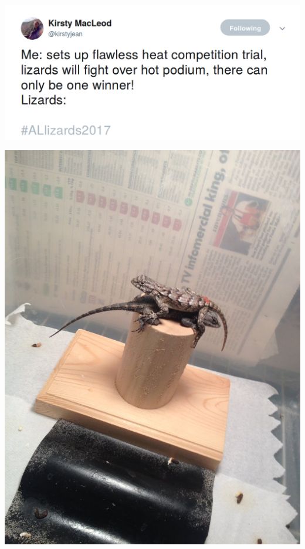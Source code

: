 \documentclass{beamer}
\begin{document}
\begin{frame}
    \begin{center}
        \includegraphics[width=.7\textwidth]{static/lizard-tweet.png}
    \end{center}
    \begin{center}
        \pause
        \includegraphics[width=.35\textwidth]{static/lizard-cooperation.jpg}
    \end{center}
\end{frame}


\begin{frame}
    \begin{center}
    
    \end{center}
\end{frame}
\end{document}
